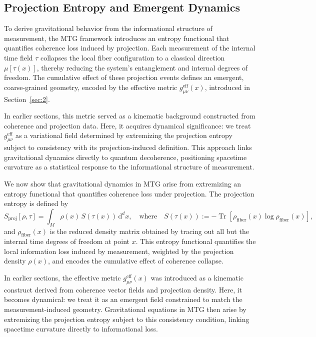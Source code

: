 \documentclass[11pt]{article}
\begin{document}
\subsection{Projection Entropy and Emergent Dynamics}\label{sec:6.1}
To derive gravitational behavior from the informational structure of measurement, the MTG framework introduces an entropy functional that quantifies coherence loss induced by projection. Each measurement of the internal time field \( \tau \) collapses the local fiber configuration to a classical direction \( \mu[\tau(x)] \), thereby reducing the system’s entanglement and internal degrees of freedom. The cumulative effect of these projection events defines an emergent, coarse-grained geometry, encoded by the effective metric \( g^{\mathrm{eff}}_{\mu\nu}(x) \), introduced in Section~\ref{sec:2}.

In earlier sections, this metric served as a kinematic background constructed from coherence and projection data. Here, it acquires dynamical significance: we treat \( g^{\mathrm{eff}}_{\mu\nu} \) as a variational field determined by extremizing the projection entropy subject to consistency with its projection-induced definition. This approach links gravitational dynamics directly to quantum decoherence, positioning spacetime curvature as a statistical response to the informational structure of measurement.

We now show that gravitational dynamics in MTG arise from extremizing an entropy functional that quantifies coherence loss under projection. The projection entropy is defined by
\begin{equation}
S_{\mathrm{proj}}[\rho, \tau] = \int_M \rho(x) \, S(\tau(x)) \, \mathrm{d}^d x,
\quad\text{where}\quad
S(\tau(x)) := -\operatorname{Tr}[\rho_{\text{fiber}}(x) \log \rho_{\text{fiber}}(x)],
\end{equation}
and \( \rho_{\text{fiber}}(x) \) is the reduced density matrix obtained by tracing out all but the internal time degrees of freedom at point \( x \). This entropy functional quantifies the local information loss induced by measurement, weighted by the projection density \( \rho(x) \), and encodes the cumulative effect of coherence collapse.

In earlier sections, the effective metric \( g^{\mathrm{eff}}_{\mu\nu}(x) \) was introduced as a kinematic construct derived from coherence vector fields and projection density. Here, it becomes dynamical: we treat it as an emergent field constrained to match the measurement-induced geometry. Gravitational equations in MTG then arise by extremizing the projection entropy subject to this consistency condition, linking spacetime curvature directly to informational loss.
\end{document}
